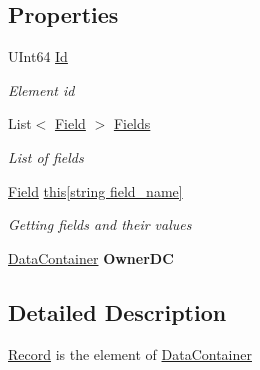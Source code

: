 \subsection*{Properties}
\begin{DoxyCompactItemize}
\item 
U\+Int64 \hyperlink{class_dwarf_d_b_1_1_data_structures_1_1_record_a6b33388f9fa7edcea1e29890da207be4}{Id}
\begin{DoxyCompactList}\small\item\em Element id \end{DoxyCompactList}\item 
List$<$ \hyperlink{class_dwarf_d_b_1_1_data_structures_1_1_field}{Field} $>$ \hyperlink{class_dwarf_d_b_1_1_data_structures_1_1_record_ae901326df950b811aa2cbb5f632a21c3}{Fields}
\begin{DoxyCompactList}\small\item\em List of fields \end{DoxyCompactList}\item 
\hyperlink{class_dwarf_d_b_1_1_data_structures_1_1_field}{Field} \hyperlink{class_dwarf_d_b_1_1_data_structures_1_1_record_a303a0895fdeb635fa47469b2ac46c4a3}{this\mbox{[}string field\+\_\+name\mbox{]}}
\begin{DoxyCompactList}\small\item\em Getting fields and their values \end{DoxyCompactList}\item 
\hypertarget{class_dwarf_d_b_1_1_data_structures_1_1_record_adc6c66e17187956974f6102e89054528}{\hyperlink{class_dwarf_d_b_1_1_data_structures_1_1_data_container}{Data\+Container} {\bfseries Owner\+D\+C}}\label{class_dwarf_d_b_1_1_data_structures_1_1_record_adc6c66e17187956974f6102e89054528}

\end{DoxyCompactItemize}


\subsection{Detailed Description}
\hyperlink{class_dwarf_d_b_1_1_data_structures_1_1_record}{Record} is the element of \hyperlink{class_dwarf_d_b_1_1_data_structures_1_1_data_container}{Data\+Container} 




